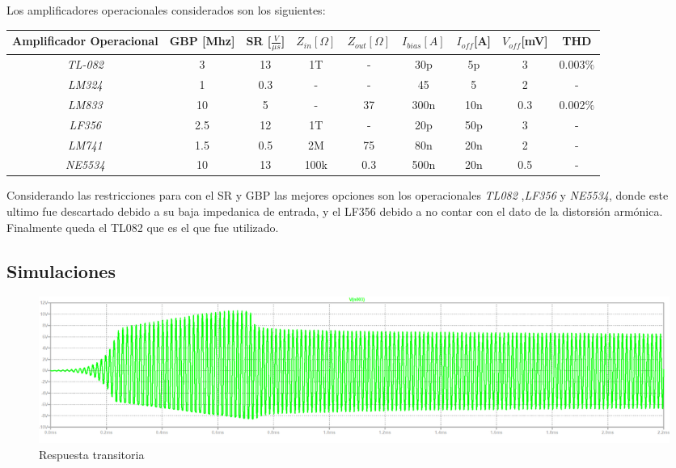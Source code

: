 Los amplificadores operacionales considerados son los siguientes:
\begin{table}[H]
\centering
\begin{tabular}{ccccccccc}
\textbf{Amplificador Operacional} & \textbf{GBP [Mhz]} & \textbf{SR [$\frac{V}{\mu s}$]} & \textbf{$Z_{in} [\Omega]$} & \textbf{$Z_{out}[\Omega]$} & \textbf{$I_{bias}[A]$} & \textbf{$I_{off}$[A]} & \textbf{$V_{off}$[mV]} & \textbf{THD} \\ \hline
\textit{TL-082}                   & 3                  & 13                              & 1T                         & -                          & 30p                 & 5p                    & 3                      & 0.003$\%$    \\
\textit{LM324}                    & 1                  & 0.3                             & -                          & -                          & 45                  & 5                     & 2                      & -            \\
\textit{LM833}                    & 10                 & 5                               & -                          & 37                         & 300n                & 10n                   & 0.3                    & 0.002$\%$    \\
\textit{LF356}                    & 2.5                & 12                              & 1T                         & -                          & 20p                 & 50p                   & 3                      & -            \\
\textit{LM741}                    & 1.5                & 0.5                             & 2M                         & 75                         & 80n                 & 20n                   & 2                      & -            \\
\textit{NE5534}                   & 10                 & 13                              & 100k                       & 0.3                        & 500n                & 20n                   & 0.5                    & -           
\end{tabular}
\end{table}

Considerando las restricciones para con el SR y GBP las mejores opciones son los operacionales \emph{TL082} ,\emph{LF356} y \emph{NE5534}, donde este ultimo fue descartado debido a su baja impedanica de entrada, y el LF356 debido a no contar con el dato de la distorsión armónica.
Finalmente queda el TL082 que es el que fue utilizado.
\subsection{Simulaciones}
\begin{figure}[H]
	\centering
	\includegraphics[width=\textwidth]{Imagenes-Ej1/trans.png}
	\caption{Respuesta transitoria}
	\label{fig:trans}

\end{figure}
